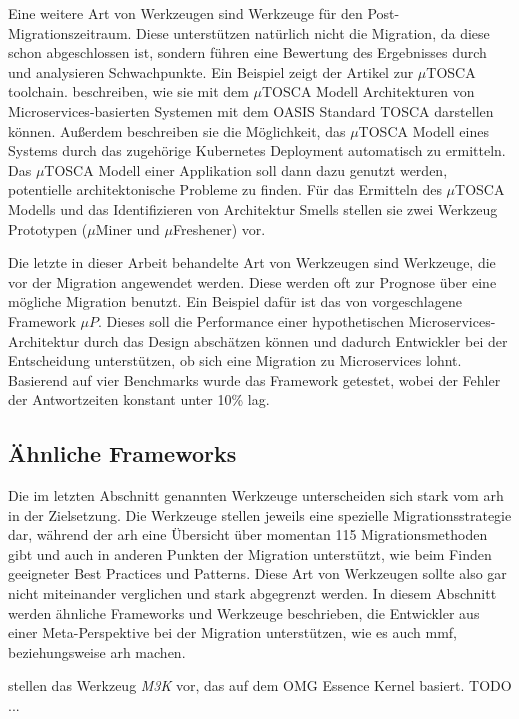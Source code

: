 Eine weitere Art von Werkzeugen sind Werkzeuge für den Post-Migrationszeitraum.
Diese unterstützen natürlich nicht die Migration, da diese schon abgeschlossen ist, sondern führen eine Bewertung des Ergebnisses durch und analysieren Schwachpunkte.
Ein Beispiel zeigt der Artikel zur $\mu$TOSCA toolchain.
 beschreiben, wie sie mit dem  $\mu$TOSCA Modell Architekturen von Microservices-basierten Systemen mit dem OASIS Standard TOSCA darstellen können.
Außerdem beschreiben sie die Möglichkeit, das $\mu$TOSCA Modell eines Systems durch das zugehörige Kubernetes Deployment automatisch zu ermitteln.
Das $\mu$TOSCA Modell einer Applikation soll dann dazu genutzt werden, potentielle architektonische Probleme zu finden.
Für das Ermitteln des $\mu$TOSCA Modells und das Identifizieren von Architektur Smells stellen sie zwei Werkzeug Prototypen ($\mu$Miner und $\mu$Freshener) vor.

Die letzte in dieser Arbeit behandelte Art von Werkzeugen sind Werkzeuge, die vor der Migration angewendet werden.
Diese werden oft zur Prognose über eine mögliche Migration benutzt.
Ein Beispiel dafür ist das von  vorgeschlagene Framework $\mu P$.
Dieses soll die Performance einer hypothetischen Microservices-Architektur durch das Design abschätzen können und dadurch Entwickler bei der Entscheidung unterstützen, ob sich eine Migration zu Microservices lohnt.
Basierend auf vier Benchmarks wurde das Framework getestet, wobei der Fehler der Antwortzeiten konstant unter 10\% lag.

\subsection{Ähnliche Frameworks}

Die im letzten Abschnitt genannten Werkzeuge unterscheiden sich stark vom \gls{arh} in der Zielsetzung.
Die Werkzeuge stellen jeweils eine spezielle Migrationsstrategie dar, während der \gls{arh} eine Übersicht über momentan 115 Migrationsmethoden gibt und auch in anderen Punkten der Migration unterstützt, wie beim Finden geeigneter Best Practices und Patterns.
Diese Art von Werkzeugen sollte also gar nicht miteinander verglichen und stark abgegrenzt werden. 
In diesem Abschnitt werden ähnliche Frameworks und Werkzeuge beschrieben, die Entwickler aus einer Meta-Perspektive bei der Migration unterstützen, wie es auch \gls{mmf}, beziehungsweise \gls{arh} machen.

 stellen das Werkzeug \emph{M3K} vor, das auf dem OMG Essence Kernel basiert.
TODO ...

